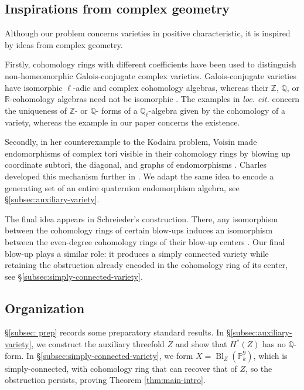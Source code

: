 \documentclass[11pt, reqno]{amsart}
\theoremstyle{definition}
\newcommand\QQ{\mathbb{Q}}
\newcommand\PP{\mathbb{P}}
\newcommand\ZZ{\mathbb{Z}}
\DeclareMathOperator{\Bl}{Bl}
\begin{document}
\subsection*{Inspirations from complex geometry}\;

Although our problem concerns varieties in positive characteristic, it
is inspired by ideas from complex geometry.

Firstly, cohomology rings with different coefficients have been used to
distinguish non-homeomorphic Galois-conjugate complex varieties.
Galois-conjugate varieties have isomorphic $\ell$-adic and complex cohomology
algebras, whereas their $\mathbb{Z}$, $\mathbb{Q}$, or $\mathbb{R}$-cohomology algebras need
not be isomorphic
\cites{Charles-conjugate,Schreieder-conjugate,
Shen-Zhang-character-varieties}.
The examples in \textit{loc. cit.} concern the uniqueness of $\ZZ$- or $\QQ$- forms of a $\QQ_{\ell}$-algebra given by the cohomology of a variety, whereas the example in our paper concerns the existence.

Secondly, in her counterexample to the Kodaira problem, Voisin made endomorphisms of complex tori visible in their
cohomology rings by blowing up coordinate subtori, the diagonal, and
graphs of endomorphisms \cite{Voisin-homotopy-types}. 
Charles developed this mechanism
further in 
\cite{Charles-conjugate}.  We adapt the same idea to encode a generating set
of an entire quaternion endomorphism algebra, see \S\ref{subsec:auxiliary-variety}.

The final idea appears in Schreieder's construction.
There, any isomorphism between the cohomology rings of certain blow-ups induces an isomorphism between the even-degree cohomology
rings of their blow-up centers \cite{Schreieder-conjugate}.
Our final blow-up plays a similar role: it produces a simply connected
variety while retaining the obstruction already encoded in the
cohomology ring of its center, see \S\ref{subsec:simply-connected-variety}.




\subsection*{Organization}\;

 \S\ref{subsec: prep} records some preparatory standard results.  
In \S\ref{subsec:auxiliary-variety}, we construct the auxiliary threefold $Z$ and show that $H^*(Z)$ has no $\QQ$-form.  
In \S\ref{subsec:simply-connected-variety}, we
form $X=\Bl_Z(\PP^9_k)$, which is simply-connected, with cohomology ring that can recover that of $Z$, so the obstruction persists, proving Theorem \ref{thm:main-intro}.
\end{document}
